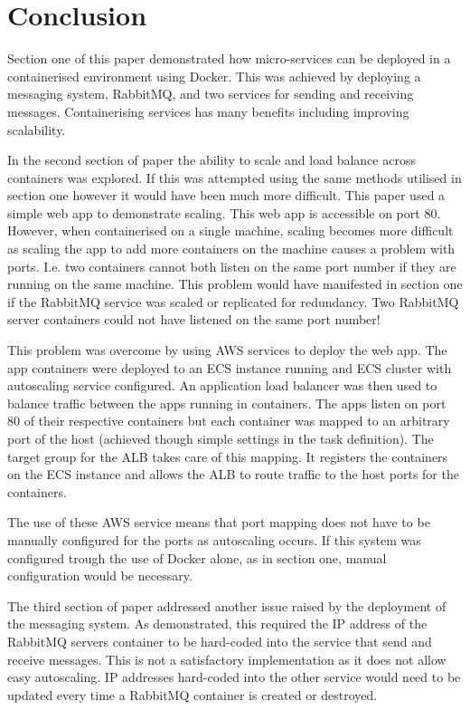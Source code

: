 \section{Conclusion}
Section one of this paper demonstrated how micro-services can be deployed in a containerised environment using Docker. This was achieved by deploying a messaging system, RabbitMQ, and two services for sending and receiving messages. Containerising services has many benefits including improving scalability.

In the second section of paper the ability to scale and load balance across containers was explored. If this was attempted using the same methods utilised in section one however it would have been much more difficult. This paper used a simple web app to demonstrate scaling. This web app is accessible on port 80. However, when containerised on a single machine, scaling becomes more difficult as scaling the app to add more containers on the machine causes a problem with ports. I.e. two containers cannot both listen on the same port number if they are running on the same machine. This problem would have manifested in section one if the RabbitMQ service was scaled or replicated for redundancy. Two RabbitMQ server containers could not have listened on the same port number!

This problem was overcome by using AWS services to deploy the web app. The app containers were deployed to an ECS instance running and ECS cluster with autoscaling service configured. An application load balancer was then used to balance traffic between the apps running in containers. The apps listen on port 80 of their respective containers  but each container was mapped to an arbitrary port of the host (achieved though simple settings in the task definition). The target group for the ALB takes care of this mapping. It registers the containers on the ECS instance and allows the ALB to route traffic to the host ports for the containers.

The use of these AWS service means that port mapping does not have to be manually configured for the ports as autoscaling occurs. If this system was configured trough the use of Docker alone, as in section one, manual configuration would be necessary.

The third section of paper addressed another issue raised by the deployment of the messaging system. As demonstrated, this required the IP address of the RabbitMQ servers container to be hard-coded into the service that send and receive messages. This is not a satisfactory implementation as it does not allow easy autoscaling. IP addresses hard-coded into the other service would need to be updated every time a RabbitMQ container is created or destroyed.

